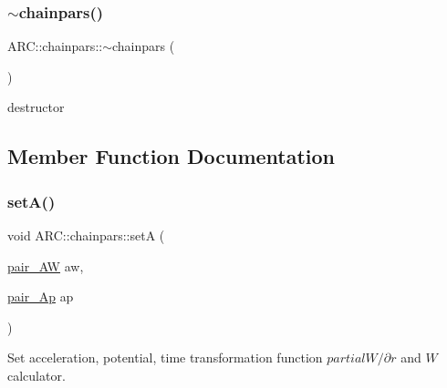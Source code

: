 \subsubsection{\texorpdfstring{$\sim$chainpars()}{~chainpars()}}
{\footnotesize\ttfamily A\+R\+C\+::chainpars\+::$\sim$chainpars (\begin{DoxyParamCaption}{ }\end{DoxyParamCaption})\hspace{0.3cm}{\ttfamily [inline]}}



destructor 



\subsection{Member Function Documentation}
\hypertarget{classARC_1_1chainpars_af639f7bc8cfbb2a0330f079df2fd556e}{}\label{classARC_1_1chainpars_af639f7bc8cfbb2a0330f079df2fd556e} 
\subsubsection{\texorpdfstring{set\+A()}{setA()}}
{\footnotesize\ttfamily void A\+R\+C\+::chainpars\+::setA (\begin{DoxyParamCaption}\item[{\hyperlink{namespaceARC_a5c4308ca4a8d0e0ff59fdce30f00274c}{pair\+\_\+\+AW}}]{aw,  }\item[{\hyperlink{namespaceARC_a819446c4644b3a3af7ef11574d0b55e0}{pair\+\_\+\+Ap}}]{ap }\end{DoxyParamCaption})\hspace{0.3cm}{\ttfamily [inline]}}



Set acceleration, potential, time transformation function $partial W/\partial r$ and $W$ calculator. 

